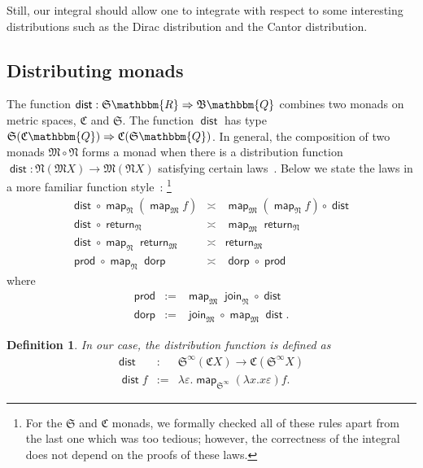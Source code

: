 \documentclass{elsarticle}
\newcommand{\assign}{:=}
\newcommand{\tmop}[1]{\ensuremath{\operatorname{#1}}}
\newtheorem{definition}{Definition}
\newcommand{\defEq}{\ensuremath{\assign}}
\newcommand{\arr}{\ensuremath{\rightarrow}}
\newcommand{\C}{\ensuremath{\mathfrak{C}}}
\newcommand{\SF}{\ensuremath{\mathfrak{S}}}
\newcommand{\BF}{\ensuremath{\mathfrak{B}}}
\begin{document}
Still, our integral should allow one to integrate with respect to some
interesting distributions such as the Dirac distribution
and the Cantor distribution.

\subsection{Distributing monads}\label{ss:dist-monad}The function
$\tmop{\mathsf{dist}} : \SF \mathbbm{R} \Rightarrow \BF \mathbbm{Q}$ combines two monads on metric
spaces, {\C} and
$\SF$. The function $\tmop{\mathsf{dist}}$ has type $\SF ( \C \mathbbm{Q})
\Rightarrow \C ( \SF \mathbbm{Q})$. In general, the composition of two monads
$\mathfrak{M} \circ \mathfrak{N}$ forms a monad when there is a distribution
function $\tmop{\mathsf{dist}} : \mathfrak{N}(\mathfrak{M}X) \rightarrow
\mathfrak{M}(\mathfrak{N}X)$ satisfying certain laws~{\cite{Beck:1969,TTT}}.
Below we state the laws in a more familiar function style~{\cite{Jones:1993}}:
{\footnote{For the {\SF} and {\C} monads, we formally checked all of these
rules apart from the last one which was too tedious; however, the correctness
of the integral does not depend on the proofs of these laws.}}
\begin{eqnarray}
  \tmop{\mathsf{dist}} \circ \tmop{\mathsf{map}}_{\mathfrak{N}}  \left(
  \tmop{\mathsf{map}}_{\mathfrak{M}} f \right) & \asymp &
  \tmop{\mathsf{map}}_{\mathfrak{M}} \left( \tmop{\mathsf{map}}_{\mathfrak{N}}
  f \right) \circ \tmop{\mathsf{dist}} \nonumber\\
  \tmop{\mathsf{dist}} \circ \tmop{\mathsf{return}}_{\mathfrak{N}} & \asymp &
  \tmop{\mathsf{map}}_{\mathfrak{M}}  \tmop{\mathsf{return}}_{\mathfrak{N}}
  \nonumber\\
  \tmop{\mathsf{dist}} \circ \tmop{\mathsf{map}}_{\mathfrak{N}}
  \tmop{\mathsf{return}}_{\mathfrak{M}} & \asymp &
  \tmop{\mathsf{return}}_{\mathfrak{M}} \nonumber\\
  \tmop{\mathsf{prod}} \circ \tmop{\mathsf{map}}_{\mathfrak{N}}
  \tmop{\mathsf{dorp}} & \asymp & \tmop{\mathsf{dorp}} \circ
  \tmop{\mathsf{prod}} \nonumber
\end{eqnarray}
where
\begin{eqnarray}
  \tmop{\mathsf{prod}} & \defEq & \tmop{\mathsf{map}}_{\mathfrak{M}}
  \tmop{\mathsf{join}}_{\mathfrak{N}} \circ \tmop{\mathsf{dist}} \nonumber\\
  \tmop{\mathsf{dorp}} & \defEq & \tmop{\mathsf{join}}_{\mathfrak{M}} \circ
  \tmop{\mathsf{map}}_{\mathfrak{M}}  \tmop{\mathsf{dist}} . \nonumber
\end{eqnarray}
\begin{definition}
  \label{StepDist}In our case, the distribution function is defined as
  \begin{eqnarray*}
    \tmop{\mathsf{dist}} & : & \SF^{\infty} \left( \C X \right)  \arr \C
    \left( \SF^{\infty} X \right)\\
    \tmop{\mathsf{dist}} f & \defEq & \lambda \varepsilon .
    \tmop{\mathsf{map}}_{\SF^{\infty}} \left( \lambda x.x \varepsilon \right)
    f.
  \end{eqnarray*}
\end{definition}
\end{document}
